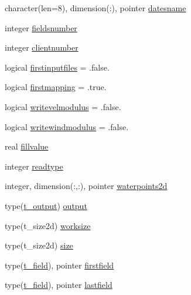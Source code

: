\begin{DoxyCompactItemize}
\item 
character(len=8), dimension(\+:), pointer \mbox{\hyperlink{structmoduletecnoceanascii_1_1t__tecnoceanascii_a799b638694870a235a90ecda24d4ec43}{datesname}}
\item 
integer \mbox{\hyperlink{structmoduletecnoceanascii_1_1t__tecnoceanascii_a20021ef8ed86dcfdedcfcca4f34216ab}{fieldsnumber}}
\item 
integer \mbox{\hyperlink{structmoduletecnoceanascii_1_1t__tecnoceanascii_a117a2b657375d2315ada36644993325d}{clientnumber}}
\item 
logical \mbox{\hyperlink{structmoduletecnoceanascii_1_1t__tecnoceanascii_a98b3f645f27466371476ea2610f0df7d}{firstinputfiles}} = .false.
\item 
logical \mbox{\hyperlink{structmoduletecnoceanascii_1_1t__tecnoceanascii_a830d0586496808d37b7154c0a0a548e7}{firstmapping}} = .true.
\item 
logical \mbox{\hyperlink{structmoduletecnoceanascii_1_1t__tecnoceanascii_af4083152468d96fdd19fc687009d4673}{writevelmodulus}} = .false.
\item 
logical \mbox{\hyperlink{structmoduletecnoceanascii_1_1t__tecnoceanascii_a30c42c2c53559d9d7076333771ee153c}{writewindmodulus}} = .false.
\item 
real \mbox{\hyperlink{structmoduletecnoceanascii_1_1t__tecnoceanascii_aec4ba426a1ca0381f3ffbd68960bb5af}{fillvalue}}
\item 
integer \mbox{\hyperlink{structmoduletecnoceanascii_1_1t__tecnoceanascii_a1b77bdeec35c8206c45429da5fd2ce82}{readtype}}
\item 
integer, dimension(\+:,\+:), pointer \mbox{\hyperlink{structmoduletecnoceanascii_1_1t__tecnoceanascii_a657b054945d3cbd6870223e4c6ae6f52}{waterpoints2d}}
\item 
type(\mbox{\hyperlink{structmoduletecnoceanascii_1_1t__output}{t\+\_\+output}}) \mbox{\hyperlink{structmoduletecnoceanascii_1_1t__tecnoceanascii_a2320865af986943863c422e8a376f78a}{output}}
\item 
type(t\+\_\+size2d) \mbox{\hyperlink{structmoduletecnoceanascii_1_1t__tecnoceanascii_ad8c68649fa07bad0338a52fb0d12f2ce}{worksize}}
\item 
type(t\+\_\+size2d) \mbox{\hyperlink{structmoduletecnoceanascii_1_1t__tecnoceanascii_afcf4f247c4ec2b05cf6598fc72003a00}{size}}
\item 
type(\mbox{\hyperlink{structmoduletecnoceanascii_1_1t__field}{t\+\_\+field}}), pointer \mbox{\hyperlink{structmoduletecnoceanascii_1_1t__tecnoceanascii_ab4687c5f0da67fe623e78f5632ff3bc0}{firstfield}}
\item 
type(\mbox{\hyperlink{structmoduletecnoceanascii_1_1t__field}{t\+\_\+field}}), pointer \mbox{\hyperlink{structmoduletecnoceanascii_1_1t__tecnoceanascii_a33e5eb53fd25ef8037fbf6122fb44fac}{lastfield}}
\end{DoxyCompactItemize}


